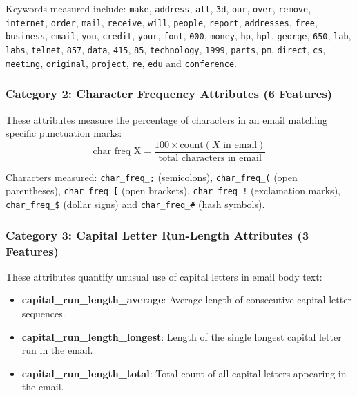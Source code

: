 \documentclass[12pt,a4paper]{article}
\begin{document}
Keywords measured include: \texttt{make}, \texttt{address}, \texttt{all}, \texttt{3d}, \texttt{our}, \texttt{over}, \texttt{remove}, \texttt{internet}, \texttt{order}, \texttt{mail}, \texttt{receive}, \texttt{will}, \texttt{people}, \texttt{report}, \texttt{addresses}, \texttt{free}, \texttt{business}, \texttt{email}, \texttt{you}, \texttt{credit}, \texttt{your}, \texttt{font}, \texttt{000}, \texttt{money}, \texttt{hp}, \texttt{hpl}, \texttt{george}, \texttt{650}, \texttt{lab}, \texttt{labs}, \texttt{telnet}, \texttt{857}, \texttt{data}, \texttt{415}, \texttt{85}, \texttt{technology}, \texttt{1999}, \texttt{parts}, \texttt{pm}, \texttt{direct}, \texttt{cs}, \texttt{meeting}, \texttt{original}, \texttt{project}, \texttt{re}, \texttt{edu} and \texttt{conference}.

\subsubsection*{Category 2: Character Frequency Attributes (6 Features)}
These attributes measure the percentage of characters in an email matching specific punctuation marks:
\begin{equation}
\text{char\_freq\_X} = \frac{100 \times \text{count}(X \text{ in email})}{\text{total characters in email}}
\end{equation}

Characters measured: \texttt{char\_freq\_;} (semicolons), \texttt{char\_freq\_(} (open parentheses), \texttt{char\_freq\_[} (open brackets), \texttt{char\_freq\_!} (exclamation marks), \texttt{char\_freq\_\$} (dollar signs) and \texttt{char\_freq\_\#} (hash symbols).

\subsubsection*{Category 3: Capital Letter Run-Length Attributes (3 Features)}
These attributes quantify unusual use of capital letters in email body text:
\begin{itemize}
\item \textbf{capital\_run\_length\_average}: Average length of consecutive capital letter sequences.
\item \textbf{capital\_run\_length\_longest}: Length of the single longest capital letter run in the email.
\item \textbf{capital\_run\_length\_total}: Total count of all capital letters appearing in the email.
\end{itemize}
\end{document}
